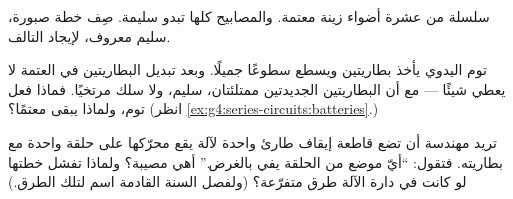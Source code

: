 \begin{exercise}[$\star$]\label{exo:g4:series-circuits:9}
سلسلة من عشرة أضواء زينة  معتمة. والمصابيح كلها تبدو
سليمة. صِف خطة صبورة،  سليم معروف، لإيجاد 
التالف.
\end{exercise}

\begin{exercise}[$\star\star$]\label{exo:g4:series-circuits:10}
 توم اليدوي يأخذ بطاريتين ويسطع سطوعًا جميلًا. وبعد تبديل
البطاريتين في العتمة لا يعطي شيئًا --- مع أن البطاريتين
الجديدتين ممتلئتان،  سليم، ولا سلك مرتخيًا. فماذا فعل
توم، ولماذا يبقى  معتمًا؟ (انظر
\cref{ex:g4:series-circuits:batteries}.)
\end{exercise}

\begin{exercise}[$\star\star$]\label{exo:g4:series-circuits:11}
تريد مهندسة أن تضع قاطعة إيقاف طارئ واحدة لآلة يقع محرّكها على
حلقة واحدة مع بطاريته. فتقول: ``أيّ موضع من الحلقة يفي
بالغرض.'' أهي مصيبة؟ ولماذا تفشل خطتها لو كانت في دارة الآلة
طرق متفرّعة؟ (ولفصل السنة القادمة اسم لتلك الطرق.)
\end{exercise}
